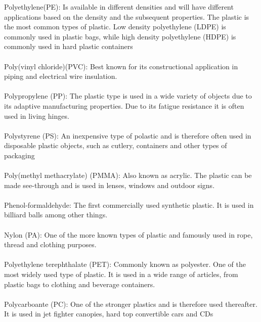 Polyethylene(PE): Is available in different densities and will have different applications based on the density and the subsequent properties. The plastic is the most common types of plastic. Low density polyethylene (LDPE) is commonly used in plastic bags, while high density polyethylene (HDPE) is commonly used in hard plastic containers
\\\\
Poly(vinyl chloride)(PVC): Best known for its constructional application in piping and electrical wire insulation.
\\\\
Polypropylene (PP): The plastic type is used in a wide variety of objects due to its adaptive manufacturing properties. Due to its fatigue resistance it is often used in living hinges. 
\\\\
Polystyrene (PS): An inexpensive type of polastic and is therefore often used in disposable plastic objects, such as cutlery, containers and other types of packaging
\\\\
Poly(methyl methacrylate) (PMMA): Also known as acrylic. The plastic can be made see-through and is used in lenses, windows and outdoor signs.
\\\\
Phenol-formaldehyde: The first commercially used synthetic plastic. It is used in billiard balls among other things. 
\\\\
Nylon (PA): One of the more known types of plastic and famously used in rope, thread and clothing purposes. 
\\\\
Polyethylene terephthalate (PET): Commonly known as polyester. One of the most widely used type of plastic. It is used in a wide range of articles, from plastic bags to clothing and beverage containers.
\\\\
Polycarboante (PC): One of the stronger plastics and is therefore used thereafter. It is used in jet fighter canopies, hard top convertible cars and CDs




